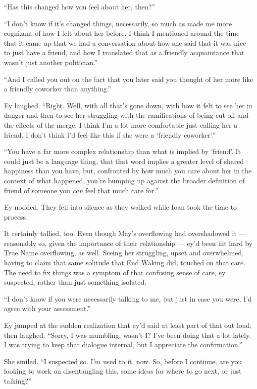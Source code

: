 ``Has this changed how you feel about her, then?''

``I don't know if it's changed things, necessarily, so much as made me more cognizant of how I felt about her before. I think I mentioned around the time that it came up that we had a conversation about how she said that it was nice to just have a friend, and how I translated that as a friendly acquaintance that wasn't just another politician.''

``And I called you out on the fact that you later said you thought of her more like a friendly coworker than anything.''

Ey laughed. ``Right. Well, with all that's gone down, with how it felt to see her in danger and then to see her struggling with the ramifications of being cut off and the effects of the merge, I think I'm a lot more comfortable just calling her a friend. I don't think I'd feel like this if she were a `friendly coworker'.''

``You have a far more complex relationship than what is implied by `friend'. It could just be a language thing, that that word implies a greater level of shared happiness than you have, but, confronted by how much you care about her in the context of what happened, you're bumping up against the broader definition of friend of someone you \emph{can} feel that much care for.''

Ey nodded. They fell into silence as they walked while Ioan took the time to process.

It certainly tallied, too. Even though May's overflowing had overshadowed it — reasonably so, given the importance of their relationship — ey'd been hit hard by True Name overflowing, as well. Seeing her struggling, upset and overwhelmed, having to claim that same solitude that End Waking did, touched on that care. The need to fix things was a symptom of that confusing sense of care, ey suspected, rather than just something isolated.

``I don't know if you were necessarily talking to me, but just in case you were, I'd agree with your assessment.''

Ey jumped at the sudden realization that ey'd said at least part of that out loud, then laughed. ``Sorry, I was mumbling, wasn't I? I've been doing that a lot lately. I was trying to keep that dialogue internal, but I appreciate the confirmation.''

She smiled. ``I suspected so. I'm used to it, now. So, before I continue, are you looking to work on disentangling this, some ideas for where to go next, or just talking?''

